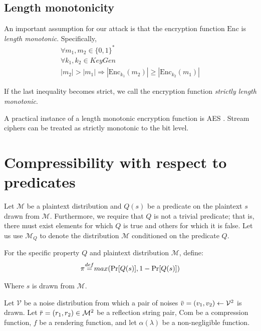 \documentclass[conference, letterpaper, 10pt]{IEEEtran}
\newcommand\defeq{\stackrel{\mathclap{\normalfont\mbox{def}}}{=}}
\newcommand{\overbar}[1]{\mkern 1.5mu\overline{\mkern-1.5mu#1\mkern-1.5mu}\mkern 1.5mu}
\begin{document}
\subsection{Length monotonicity}\label{subsec:lenmonotone}

An important assumption for our attack is that the encryption function
$\textrm{Enc}$ is
\textit{length monotonic}. Specifically,
\begin{equation*}
\begin{split}
\forall m_1, m_2 \in \{0, 1\}^*\\
\forall k_1, k_2 \in KeyGen\\
|m_2| > |m_1|
\Rightarrow
|\textrm{Enc}_{k_1}(m_2)| \geq |\textrm{Enc}_{k_2}(m_1)|
\end{split}
\end{equation*}

If the last inequality becomes strict, we call the encryption function
\textit{strictly length monotonic}.

A practical instance of a length monotonic encryption function is AES \cite{c8}.
Stream ciphers can be treated as strictly monotonic to the bit level.

\section{Compressibility with respect to predicates}\label{sec:propertycom}

Let $\mathcal{M}$ be a plaintext distribution and $Q(s)$ be a predicate on the
plaintext $s$ drawn from $\mathcal{M}$. Furthermore, we require that $Q$ is not a
trivial predicate; that is, there must exist elements for which $Q$ is true and
others for which it is false.  Let us use $\mathcal{M}_Q$ to denote the
distribution $\mathcal{M}$ conditioned on the predicate $Q$.

For the specific property $Q$ and plaintext distribution $\mathcal{M}$, define:
\begin{equation*}
    \pi \defeq max(\Pr[Q(s)], 1 - \Pr[Q(s)])
\end{equation*}

Where $s$ is drawn from $\mathcal{M}$.

Let $\mathcal{V}$ be a noise distribution from which a pair of noises
$\overbar{v} = (v_1, v_2) \leftarrow \mathcal{V}^2$ is drawn.  Let $\overbar{r}
= (r_1, r_2) \in \mathcal{M}^2$ be a reflection string pair, $\textrm{Com}$ be a
compression function, $f$ be a rendering function, and let $\alpha(\lambda)$ be
a non-negligible function.
\end{document}
